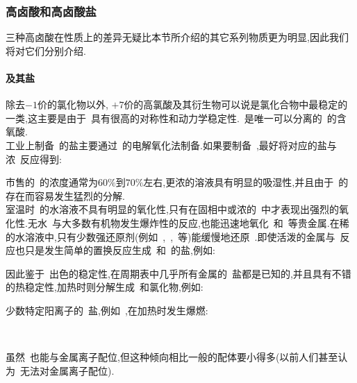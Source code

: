 \documentclass{ctexbook}
\begin{document}
\subsubsection{高卤酸和高卤酸盐}
三种高卤酸在性质上的差异无疑比本节所介绍的其它系列物质更为明显,因此我们将对它们分别介绍.
\paragraph{及其盐}
除去$-1$价的氯化物以外, $+7$价的高氯酸及其衍生物可以说是氯化合物中最稳定的一类,这主要是由于~具有很高的对称性和动力学稳定性.~是唯一可以分离的~的含氧酸.\\
\indent 工业上制备~的盐主要通过~的电解氧化法制备.如果要制备~,最好将对应的盐与浓~反应得到:
\begin{tightcenter}
\end{tightcenter}
市售的~的浓度通常为$60\%$到$70\%$左右,更浓的溶液具有明显的吸湿性,并且由于~的存在而容易发生猛烈的分解.\\
\indent 室温时~的水溶液不具有明显的氧化性,只有在固相中或浓的~中才表现出强烈的氧化性.无水~与大多数有机物发生爆炸性的反应,也能迅速地氧化~和~等贵金属.在稀的水溶液中,只有少数强还原剂(例如~,~,~等)能缓慢地还原~.即使活泼的金属与~反应也只是发生简单的置换反应生成~和~的盐,例如:
\begin{tightcenter}
\end{tightcenter}
因此鉴于~出色的稳定性,在周期表中几乎所有金属的~盐都是已知的,并且具有不错的热稳定性,加热时则分解生成~和氯化物,例如:
\begin{tightcenter}
\end{tightcenter}
少数特定阳离子的~盐,例如~,在加热时发生爆燃:
\begin{tightcenter}
    \\
\end{tightcenter}
\indent 虽然~\ce{[ClO4]-}也能与金属离子配位,但这种倾向相比一般的配体要小得多(以前人们甚至认为~无法对金属离子配位).
\end{document}

